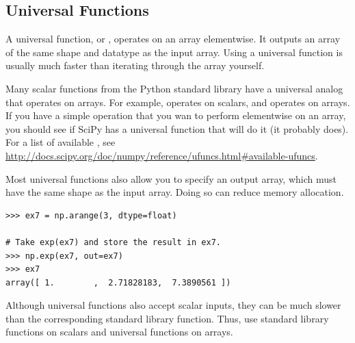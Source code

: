 \subsection*{Universal Functions}

A universal function, or , operates on an array elementwise. It outputs an array of the same shape and datatype as the input array. Using a universal function is usually much faster than iterating through the array yourself.

Many scalar functions from the Python standard library have a universal analog that operates on arrays. For example,  operates on scalars, and  operates on arrays. If you have a simple operation that you wan to perform elementwise on an array, you should see if SciPy has a universal function that will do it (it probably does). For a list of available , see \url{http://docs.scipy.org/doc/numpy/reference/ufuncs.html#available-ufuncs}.

Most universal functions also allow you to specify an output array, which must have the same shape as the input array.
Doing so can reduce memory allocation. 

\begin{lstlisting}
>>> ex7 = np.arange(3, dtype=float)

# Take exp(ex7) and store the result in ex7.
>>> np.exp(ex7, out=ex7) 
>>> ex7
array([ 1.        ,  2.71828183,  7.3890561 ])
\end{lstlisting}

Although universal functions also accept scalar inputs, they can be much slower than the corresponding standard library function. Thus, use standard library functions on scalars and universal functions on arrays.

